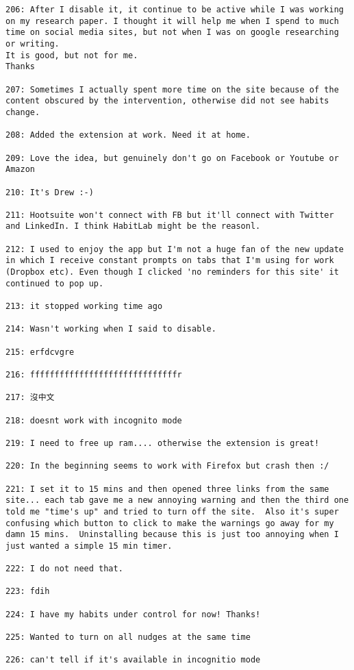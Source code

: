 \begin{lstlisting}[breaklines]
206: After I disable it, it continue to be active while I was working on my research paper. I thought it will help me when I spend to much time on social media sites, but not when I was on google researching or writing. 
It is good, but not for me. 
Thanks

207: Sometimes I actually spent more time on the site because of the content obscured by the intervention, otherwise did not see habits change.

208: Added the extension at work. Need it at home.

209: Love the idea, but genuinely don't go on Facebook or Youtube or Amazon

210: It's Drew :-)

211: Hootsuite won't connect with FB but it'll connect with Twitter and LinkedIn. I think HabitLab might be the reasonl.

212: I used to enjoy the app but I'm not a huge fan of the new update in which I receive constant prompts on tabs that I'm using for work (Dropbox etc). Even though I clicked 'no reminders for this site' it continued to pop up.

213: it stopped working time ago

214: Wasn't working when I said to disable.

215: erfdcvgre

216: ffffffffffffffffffffffffffffffr

217: 沒中文

218: doesnt work with incognito mode

219: I need to free up ram.... otherwise the extension is great!

220: In the beginning seems to work with Firefox but crash then :/

221: I set it to 15 mins and then opened three links from the same site... each tab gave me a new annoying warning and then the third one told me "time's up" and tried to turn off the site.  Also it's super confusing which button to click to make the warnings go away for my damn 15 mins.  Uninstalling because this is just too annoying when I just wanted a simple 15 min timer.

222: I do not need that.

223: fdih

224: I have my habits under control for now! Thanks!

225: Wanted to turn on all nudges at the same time

226: can't tell if it's available in incognitio mode


\end{lstlisting}
